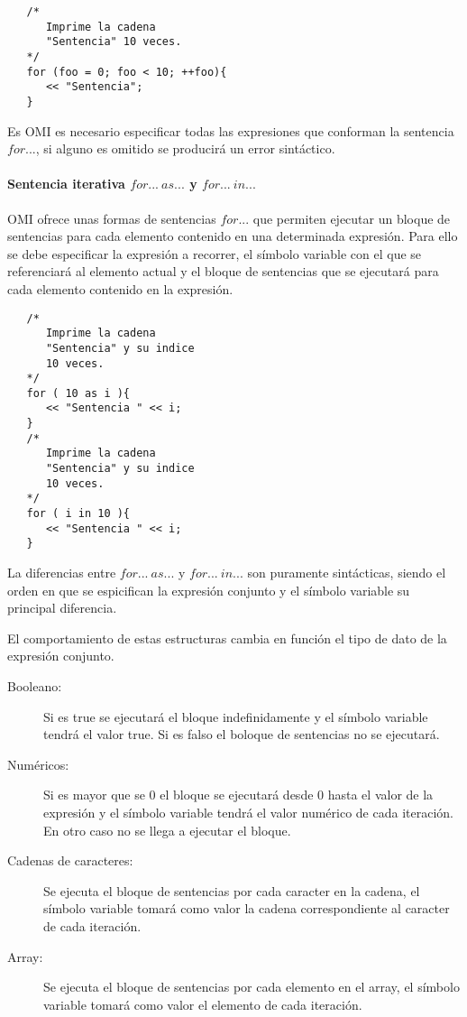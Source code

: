 \begin{lstlisting}
   /*
      Imprime la cadena 
      "Sentencia" 10 veces.
   */
   for (foo = 0; foo < 10; ++foo){
      << "Sentencia"; 
   }
\end{lstlisting}

Es OMI es necesario especificar todas las expresiones que conforman la sentencia $for...$, si alguno es omitido se
producirá un error sintáctico.


\paragraph{Sentencia iterativa $for...\ as...$ y $for...\ in...$} \label{sec:stmt_foreach}

OMI ofrece unas formas de sentencias $for...$ que permiten ejecutar un bloque de sentencias para cada elemento contenido 
en una determinada expresión. Para ello se debe especificar la expresión a recorrer, el símbolo variable con el 
que se referenciará al elemento actual y el bloque de sentencias que se ejecutará para cada elemento contenido 
en la expresión. \\


\begin{lstlisting}
   /*
      Imprime la cadena 
      "Sentencia" y su indice 
      10 veces.
   */
   for ( 10 as i ){
      << "Sentencia " << i; 
   }
   /*
      Imprime la cadena 
      "Sentencia" y su indice
      10 veces.
   */
   for ( i in 10 ){
      << "Sentencia " << i; 
   }
\end{lstlisting}


La diferencias entre $for...\ as...$ y $for...\ in...$ son puramente sintácticas, siendo el orden en que se espicifican la expresión conjunto y el
símbolo variable su principal diferencia.

El comportamiento de estas estructuras cambia en función el tipo de dato de la expresión conjunto. 

\begin{description}
\item [Booleano:] Si es true se ejecutará el bloque indefinidamente y el símbolo variable tendrá el valor true. Si es falso el boloque de sentencias no se ejecutará.
\item [Numéricos:] Si es mayor que se $0$ el bloque se ejecutará desde 0 hasta el valor de la expresión y el símbolo variable tendrá el valor numérico de cada iteración.
En otro caso no se llega a ejecutar el bloque.
\item [Cadenas de caracteres:] Se ejecuta el bloque de sentencias por cada caracter en la cadena, el símbolo variable tomará como valor la cadena correspondiente al 
caracter de cada iteración.
\item [Array:] Se ejecuta el bloque de sentencias por cada elemento en el array, el símbolo variable tomará como valor el elemento de cada iteración.
\end{description} 

